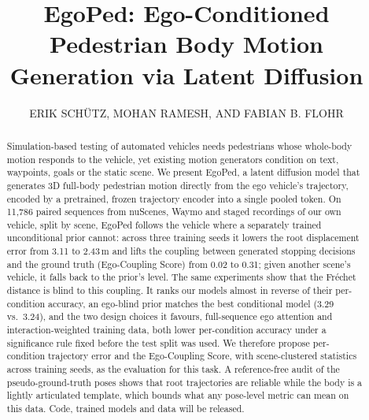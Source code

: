 \documentclass{ieeeoj}
\newcommand{\method}{EgoPed\xspace}
\begin{document}

\title{EgoPed: Ego-Conditioned Pedestrian Body Motion Generation via Latent Diffusion}

\author{ERIK SCH\"UTZ, MOHAN RAMESH, AND FABIAN B. FLOHR}

\begin{abstract}
Simulation-based testing of automated vehicles needs pedestrians whose whole-body motion responds to the vehicle, yet existing motion generators condition on text, waypoints, goals or the static scene.
We present \method, a latent diffusion model that generates 3D full-body pedestrian motion directly from the ego vehicle's trajectory, encoded by a pretrained, frozen trajectory encoder into a single pooled token.
On 11{,}786 paired sequences from nuScenes, Waymo and staged recordings of our own vehicle, split by scene, \method follows the vehicle where a separately trained unconditional prior cannot: across three training seeds it lowers the root displacement error from 3.11 to 2.43\,m and lifts the coupling between generated stopping decisions and the ground truth (Ego-Coupling Score) from 0.02 to 0.31; given another scene's vehicle, it falls back to the prior's level.
The same experiments show that the Fréchet distance is blind to this coupling. It ranks our models almost in reverse of their per-condition accuracy, an ego-blind prior matches the best conditional model (3.29 vs.\ 3.24), and the two design choices it favours, full-sequence ego attention and interaction-weighted training data, both lower per-condition accuracy under a significance rule fixed before the test split was used.
We therefore propose per-condition trajectory error and the Ego-Coupling Score, with scene-clustered statistics across training seeds, as the evaluation for this task.
A reference-free audit of the pseudo-ground-truth poses shows that root trajectories are reliable while the body is a lightly articulated template, which bounds what any pose-level metric can mean on this data.
Code, trained models and data will be released.
\end{abstract}
\end{document}
